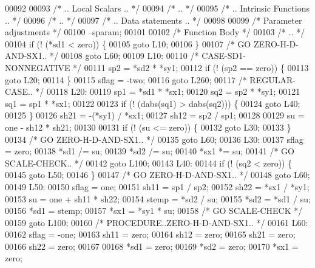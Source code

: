 \begin{DoxyCode}
00092 
00093 \textcolor{comment}{/*     .. Local Scalars .. */}
00094 \textcolor{comment}{/*     .. */}
00095 \textcolor{comment}{/*     .. Intrinsic Functions .. */}
00096 \textcolor{comment}{/*     .. */}
00097 \textcolor{comment}{/*     .. Data statements .. */}
00098 
00099     \textcolor{comment}{/* Parameter adjustments */}
00100     --sparam;
00101 
00102     \textcolor{comment}{/* Function Body */}
00103 \textcolor{comment}{/*     .. */}
00104     \textcolor{keywordflow}{if} (! (*sd1 < zero)) \{
00105     \textcolor{keywordflow}{goto} L10;
00106     \}
00107 \textcolor{comment}{/*       GO ZERO-H-D-AND-SX1.. */}
00108     \textcolor{keywordflow}{goto} L60;
00109 L10:
00110 \textcolor{comment}{/*     CASE-SD1-NONNEGATIVE */}
00111     sp2 = *sd2 * *sy1;
00112     \textcolor{keywordflow}{if} (! (sp2 == zero)) \{
00113     \textcolor{keywordflow}{goto} L20;
00114     \}
00115     sflag = -two;
00116     \textcolor{keywordflow}{goto} L260;
00117 \textcolor{comment}{/*     REGULAR-CASE.. */}
00118 L20:
00119     sp1 = *sd1 * *sx1;
00120     sq2 = sp2 * *sy1;
00121     sq1 = sp1 * *sx1;
00122 
00123     \textcolor{keywordflow}{if} (! (dabs(sq1) > dabs(sq2))) \{
00124     \textcolor{keywordflow}{goto} L40;
00125     \}
00126     sh21 = -(*sy1) / *sx1;
00127     sh12 = sp2 / sp1;
00128 
00129     su = one - sh12 * sh21;
00130 
00131     \textcolor{keywordflow}{if} (! (su <= zero)) \{
00132     \textcolor{keywordflow}{goto} L30;
00133     \}
00134 \textcolor{comment}{/*         GO ZERO-H-D-AND-SX1.. */}
00135     \textcolor{keywordflow}{goto} L60;
00136 L30:
00137     sflag = zero;
00138     *sd1 /= su;
00139     *sd2 /= su;
00140     *sx1 *= su;
00141 \textcolor{comment}{/*         GO SCALE-CHECK.. */}
00142     \textcolor{keywordflow}{goto} L100;
00143 L40:
00144     \textcolor{keywordflow}{if} (! (sq2 < zero)) \{
00145     \textcolor{keywordflow}{goto} L50;
00146     \}
00147 \textcolor{comment}{/*         GO ZERO-H-D-AND-SX1.. */}
00148     \textcolor{keywordflow}{goto} L60;
00149 L50:
00150     sflag = one;
00151     sh11 = sp1 / sp2;
00152     sh22 = *sx1 / *sy1;
00153     su = one + sh11 * sh22;
00154     stemp = *sd2 / su;
00155     *sd2 = *sd1 / su;
00156     *sd1 = stemp;
00157     *sx1 = *sy1 * su;
00158 \textcolor{comment}{/*         GO SCALE-CHECK */}
00159     \textcolor{keywordflow}{goto} L100;
00160 \textcolor{comment}{/*     PROCEDURE..ZERO-H-D-AND-SX1.. */}
00161 L60:
00162     sflag = -one;
00163     sh11 = zero;
00164     sh12 = zero;
00165     sh21 = zero;
00166     sh22 = zero;
00167 
00168     *sd1 = zero;
00169     *sd2 = zero;
00170     *sx1 = zero;

\end{DoxyCode}
